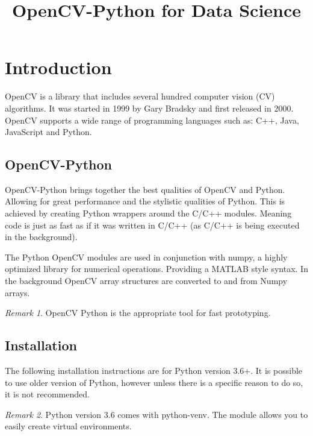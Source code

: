\documentclass{article}
\theoremstyle{definition}
\theoremstyle{remark}
\newtheorem*{rem}{Remark}
\begin{document}
\title{ OpenCV-Python for Data Science  }
\author{ }
\date{ }
\maketitle

\setcounter{tocdepth}{2}
\tableofcontents
\newpage

\section{Introduction}

OpenCV is a library that includes several hundred computer vision (CV) algorithms. It was started in 1999 by Gary Bradsky and first released in 2000. OpenCV supports a wide range of programming languages such as: C++, Java, JavaScript and Python.

\subsection{OpenCV-Python}

OpenCV-Python brings together the best qualities of OpenCV and Python. Allowing for great performance and the stylistic qualities of Python. This is achieved by creating Python wrappers around the C/C++ modules. Meaning code is just as fast as if it was written in C/C++ (as C/C++ is being executed in the background).

The Python OpenCV modules are used in conjunction with numpy, a highly optimized library for numerical operations. Providing a MATLAB style syntax. In the background OpenCV array structures are converted to and from Numpy arrays.

\begin{rem}
OpenCV Python is the appropriate tool for fast prototyping.
\end{rem}

\subsection{Installation}

The following installation instructions are for Python version 3.6+. It is possible to use older version of Python, however unless there is a specific reason to do so, it is not recommended. 

\begin{rem}
Python version 3.6 comes with python-venv. The module allows you to easily create virtual environments.
\end{rem}
\end{document}
